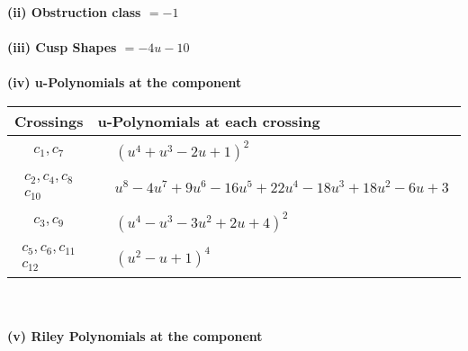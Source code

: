 \documentclass[1p]{elsarticle_modified}
\theoremstyle{definition}
\begin{document}
\flushleft \textbf{(ii) Obstruction class $= -1$}\\~\\
\flushleft \textbf{(iii) Cusp Shapes $= -4 u-10$}\\~\\
\newpage\renewcommand{\arraystretch}{1}
\flushleft \textbf{(iv) u-Polynomials at the component}\newline \\
\begin{tabular}{m{50pt}|m{274pt}}
Crossings & \hspace{64pt}u-Polynomials at each crossing \\
\hline $$\begin{aligned}c_{1},c_{7}\end{aligned}$$&$\begin{aligned}
&(u^4+u^3-2 u+1)^2
\end{aligned}$\\
\hline $$\begin{aligned}c_{2},c_{4},c_{8}\\c_{10}\end{aligned}$$&$\begin{aligned}
&u^8-4 u^7+9 u^6-16 u^5+22 u^4-18 u^3+18 u^2-6 u+3
\end{aligned}$\\
\hline $$\begin{aligned}c_{3},c_{9}\end{aligned}$$&$\begin{aligned}
&(u^4- u^3-3 u^2+2 u+4)^2
\end{aligned}$\\
\hline $$\begin{aligned}c_{5},c_{6},c_{11}\\c_{12}\end{aligned}$$&$\begin{aligned}
&(u^2- u+1)^4
\end{aligned}$\\
\hline
\end{tabular}\\~\\
\newpage\renewcommand{\arraystretch}{1}
\flushleft \textbf{(v) Riley Polynomials at the component}\newline \\
\end{document}
